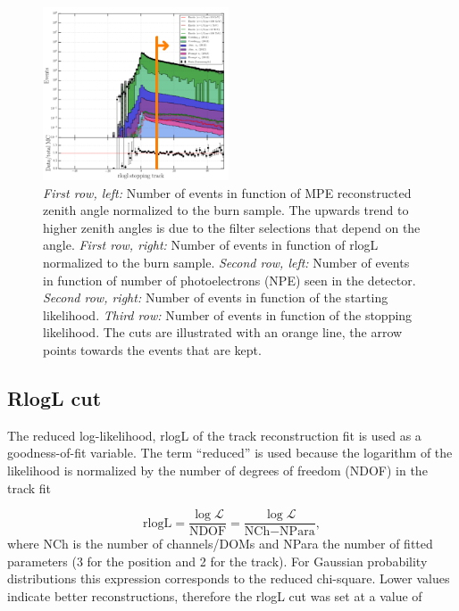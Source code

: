 \begin{figure}[t]
\includegraphics[width=0.49\textwidth]{chapter8/img/L3_zenithcut_gr_1p4835298642_rloglcut_less_15_npecut_less_50_startingtrackcut_hs_gr_0_1D_stack_finitereco_rllh_stopping.png}
\caption{\textit{First row, left: }Number of events in function of MPE reconstructed zenith angle normalized to the burn sample. The upwards trend to higher zenith angles is due to the filter selections that depend on the angle. \textit{First row, right: }Number of events in function of rlogL normalized to the burn sample. \textit{Second row, left: }Number of events in function of number of photoelectrons (NPE) seen in the detector. \textit{Second row, right: }Number of events in function of the starting likelihood. \textit{Third row: }Number of events in function of the stopping likelihood. The cuts are illustrated with an orange line, the arrow points towards the events that are kept.}
\label{fig:level3cuts}
\end{figure}


\subsection{RlogL cut}
The reduced log-likelihood, rlogL of the track reconstruction fit is used as a goodness-of-fit variable. The term ``reduced'' is used because the logarithm of the likelihood is normalized by the number of degrees of freedom (NDOF) in the track fit

\begin{equation}
\textrm{rlogL} = \frac{\log \mathcal{L}}{\textrm{NDOF}} = \frac{\log \mathcal{L}}{\textrm{NCh} - \textrm{NPara}},
\end{equation}
where NCh is the number of channels/DOMs and NPara the number of fitted parameters (3 for the position and 2 for the track). For Gaussian probability distributions this expression corresponds to the reduced chi-square. Lower values indicate better reconstructions, therefore the rlogL cut was set at a value of 

